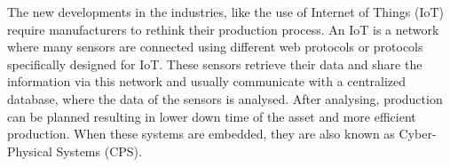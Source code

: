 The new developments in the industries, like the use of Internet of Things (IoT) require manufacturers to rethink their production process. An IoT is a network where many sensors are connected using different web protocols or protocols specifically designed for IoT. These sensors retrieve their data and share the information via this network and usually communicate with a centralized database, where the data of the sensors is analysed. After analysing, production can be planned resulting in lower down time of the asset and more efficient production. When these systems are embedded, they are also known as Cyber-Physical Systems (CPS). 



